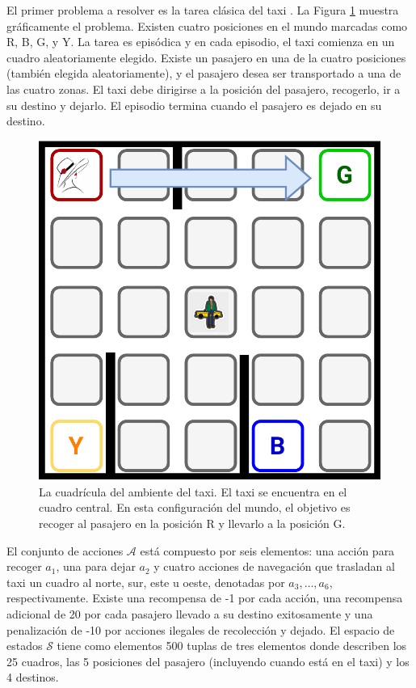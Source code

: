 El primer problema a resolver es la tarea clásica del taxi \cite{Dietterich:2000:HRL:1622262.1622268}.
La Figura \ref{fig:taxi} muestra gráficamente el problema.
Existen cuatro posiciones en el mundo marcadas como R, B, G, y Y. 
La tarea es episódica y en cada episodio, 
el taxi comienza en un cuadro aleatoriamente elegido. 
Existe un pasajero en una de la cuatro posiciones (también elegida
aleatoriamente), y el pasajero desea ser transportado a una de las
cuatro zonas.
El taxi debe dirigirse a la posición del pasajero, recogerlo, ir a su destino y dejarlo.
El episodio termina cuando el pasajero es dejado en su destino.

\begin{figure}[H]
    \centering
    \includegraphics[scale=0.2]{Chapter5/Figs/taxi-env.pdf}
    \caption{La cuadrícula del ambiente del taxi. El taxi se encuentra en el cuadro central. En esta configuración del mundo, el objetivo es recoger al pasajero en la posición R y llevarlo a la posición G.}
    \label{fig:taxi}
\end{figure}

El conjunto de acciones $\mathcal{A}$ está compuesto por seis elementos: una acción para recoger $a_1$, una para dejar $a_2$ y
cuatro acciones de 
navegación que trasladan al taxi un cuadro al norte, sur, 
este u oeste, denotadas por $a_3, \dots, a_6$, respectivamente.
Existe una recompensa de -1 por cada acción, una recompensa adicional de 20 por cada pasajero llevado a su destino 
exitosamente y una penalización de -10 por acciones ilegales
de recolección y dejado.
El espacio de estados $\mathcal{S}$ tiene como elementos 
500 tuplas de tres elementos donde describen los 25 cuadros, las 5 posiciones del pasajero (incluyendo cuando está en el taxi) y los 4 destinos.


